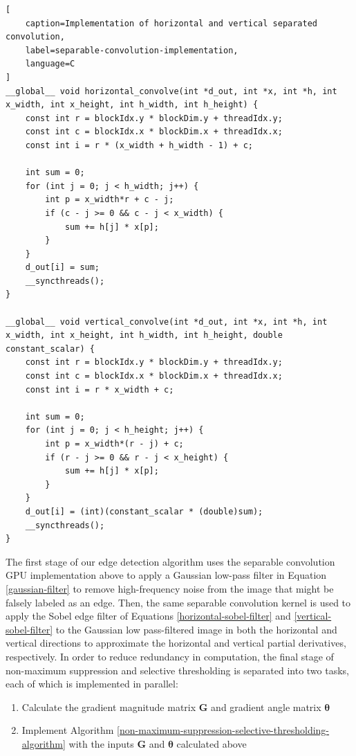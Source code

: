 \documentclass[journal]{IEEEtran}
\begin{document}
\begin{lstlisting}[
	caption=Implementation of horizontal and vertical separated convolution,
	label=separable-convolution-implementation,
	language=C
]
__global__ void horizontal_convolve(int *d_out, int *x, int *h, int x_width, int x_height, int h_width, int h_height) {
    const int r = blockIdx.y * blockDim.y + threadIdx.y;
    const int c = blockIdx.x * blockDim.x + threadIdx.x;
    const int i = r * (x_width + h_width - 1) + c;
    
    int sum = 0;
    for (int j = 0; j < h_width; j++) {
        int p = x_width*r + c - j;
        if (c - j >= 0 && c - j < x_width) {
            sum += h[j] * x[p];
        }
    }
    d_out[i] = sum;
    __syncthreads();
}

__global__ void vertical_convolve(int *d_out, int *x, int *h, int x_width, int x_height, int h_width, int h_height, double constant_scalar) {
	const int r = blockIdx.y * blockDim.y + threadIdx.y;
	const int c = blockIdx.x * blockDim.x + threadIdx.x;
	const int i = r * x_width + c;

    int sum = 0;
    for (int j = 0; j < h_height; j++) {
        int p = x_width*(r - j) + c;
        if (r - j >= 0 && r - j < x_height) {
            sum += h[j] * x[p];
        }
    }
    d_out[i] = (int)(constant_scalar * (double)sum);
    __syncthreads();
}
\end{lstlisting}
\par The first stage of our edge detection algorithm uses the separable convolution GPU implementation above to apply a Gaussian low-pass filter in Equation \ref{gaussian-filter} to remove high-frequency noise from the image that might be falsely labeled as an edge. Then, the same separable convolution kernel is used to apply the Sobel edge filter of Equations \ref{horizontal-sobel-filter} and \ref{vertical-sobel-filter} to the Gaussian low pass-filtered image in both the horizontal and vertical directions to approximate the horizontal and vertical partial derivatives, respectively. In order to reduce redundancy in computation, the final stage of non-maximum suppression and selective thresholding is separated into two tasks, each of which is implemented in parallel:
\begin{enumerate}
	\item Calculate the gradient magnitude matrix $\boldsymbol{G}$ and gradient angle matrix $\boldsymbol{\theta}$
	\item Implement Algorithm \ref{non-maximum-suppression-selective-thresholding-algorithm} with the inputs $\boldsymbol{G}$ and $\boldsymbol{\theta}$ calculated above
\end{enumerate}
\end{document}
